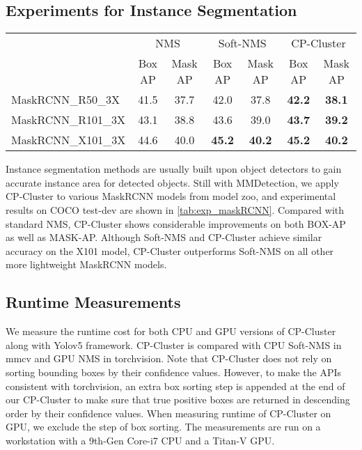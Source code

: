 \documentclass[10pt,twocolumn,letterpaper]{article}
\begin{document}
\subsection{Experiments for Instance Segmentation}
\begin{table*}[!ht]
  \centering
  \small
  \begin{tabular}{lcccccc}
  \toprule
                     & \multicolumn{2}{c}{NMS}              & \multicolumn{2}{c}{Soft-NMS}                      & \multicolumn{2}{c}{CP-Cluster}                    \\ 
                     & Box AP & Mask AP & Box AP & Mask AP & Box AP & Mask AP \\ 
  \midrule
  MaskRCNN\_R50\_3X  & 41.5   & 37.7    & 42.0          & 37.8          & \textbf{42.2} & \textbf{38.1} \\ 
  MaskRCNN\_R101\_3X & 43.1   & 38.8    & 43.6          & 39.0          & \textbf{43.7} & \textbf{39.2} \\ 
  MaskRCNN\_X101\_3X & 44.6   & 40.0    & \textbf{45.2} & \textbf{40.2} & \textbf{45.2} & \textbf{40.2} \\ 
  \bottomrule
  \end{tabular}
  \caption{CP-Cluster for MaskRCNN on COCO test-dev.}
  \label{tab:exp_maskRCNN}
\end{table*}
Instance segmentation methods are usually built upon object detectors to gain accurate instance area for detected objects.
Still with MMDetection, we apply CP-Cluster to various MaskRCNN models from model zoo, and experimental results on COCO test-dev are shown in \cref{tab:exp_maskRCNN}.
Compared with standard NMS, CP-Cluster shows considerable improvements on both BOX-AP as well as MASK-AP. Although Soft-NMS and CP-Cluster achieve similar accuracy on the X101 model, CP-Cluster outperforms Soft-NMS on all other more lightweight MaskRCNN models.

\subsection{Runtime Measurements}
\label{sec:sub_exp_runtime}
We measure the runtime cost for both CPU and GPU versions of CP-Cluster along with Yolov5 framework. CP-Cluster is compared with CPU Soft-NMS in mmcv and GPU NMS in torchvision.
Note that CP-Cluster does not rely on sorting bounding boxes by their confidence values. However, to make the APIs consistent with torchvision, an extra box sorting step is appended at the end of our CP-Cluster to make sure that true positive boxes are returned in descending order by their confidence values.
When measuring runtime of CP-Cluster on GPU, we exclude the step of box sorting. The measurements are run on a workstation with a 9th-Gen Core-i7 CPU and a Titan-V GPU.
\end{document}
